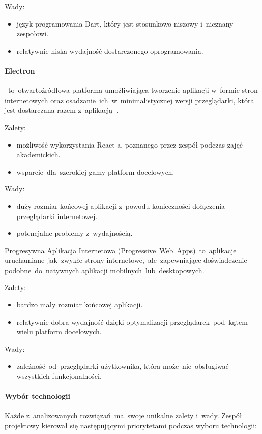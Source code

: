 Wady:
\begin{itemize}
    \item język programowania Dart, który jest stosunkowo niszowy i~nieznany zespołowi.
    \item relatywnie niska wydajność dostarczonego oprogramowania\cite{flutter-perf}.
\end{itemize}

\paragraph{Electron}~to~otwartoźródłowa platforma umożliwiająca tworzenie aplikacji w~formie stron internetowych oraz osadzanie~ich~w~minimalistycznej wersji przeglądarki, która jest dostarczana razem z~aplikacją~\cite{electron-in-action}.

Zalety:
\begin{itemize}
    \item możliwość wykorzystania React-a, poznanego przez zespół podczas zajęć akademickich.
    \item wsparcie~dla~szerokiej gamy platform docelowych.
\end{itemize}

Wady:
\begin{itemize}
    \item duży rozmiar końcowej aplikacji z~powodu konieczności dołączenia przeglądarki internetowej.
    \item potencjalne problemy z~wydajnością.
\end{itemize}

\indent Progresywna Aplikacja Internetowa (Progressive~Web~Apps)~to~aplikacje uruchamiane~jak~zwykłe strony internetowe,~ale~zapewniające doświadczenie podobne~do~natywnych aplikacji mobilnych~lub~desktopowych.\cite{pwa-book}

Zalety:
\begin{itemize}
    \item bardzo mały rozmiar końcowej aplikacji.
    \item relatywnie dobra wydajność dzięki optymalizacji przeglądarek~pod~kątem wielu platform docelowych.
\end{itemize}

Wady:
\begin{itemize}
    \item zależność~od~przeglądarki użytkownika, która może~nie~obsługiwać wszystkich funkcjonalności.
\end{itemize}

\paragraph{Wybór technologii}
\indent Każde z~analizowanych rozwiązań~ma~swoje unikalne zalety i~wady.
Zespół projektowy kierował się następującymi priorytetami podczas wyboru technologii:

